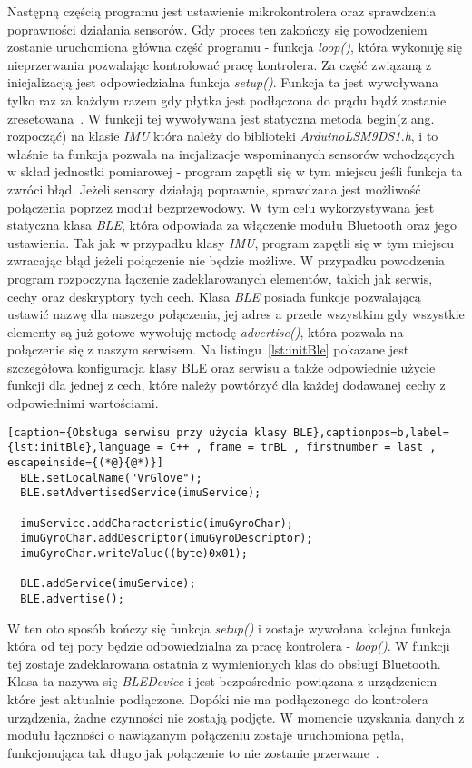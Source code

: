 Następną częścią programu jest ustawienie mikrokontrolera oraz sprawdzenia poprawności działania sensorów. Gdy proces ten zakończy się powodzeniem zostanie uruchomiona główna część programu - funkcja \textit{loop()}, która wykonuję się nieprzerwania pozwalając kontrolować pracę kontrolera. Za część związaną z inicjalizacją jest odpowiedzialna funkcja \textit{setup()}. Funkcja ta jest wywoływana tylko raz za każdym razem gdy płytka jest podłączona do prądu bądź zostanie zresetowana~\cite{ArduinoDoc}. W funkcji tej wywoływana jest statyczna metoda begin(z ang. rozpocząć) na klasie \textit{IMU} która należy do biblioteki \textit{Arduino\textunderscore LSM9DS1.h}, i to właśnie ta funkcja pozwala na incjalizacje wspominanych sensorów wchodzących w skład jednostki pomiarowej - program zapętli się w tym miejscu jeśli funkcja ta zwróci błąd.
Jeżeli sensory działają poprawnie, sprawdzana jest możliwość połączenia poprzez moduł bezprzewodowy. W tym celu wykorzystywana jest statyczna klasa \textit{BLE}, która odpowiada za włączenie modułu Bluetooth oraz jego ustawienia. Tak jak w przypadku klasy \textit{IMU}, program zapętli się w tym miejscu zwracając błąd jeżeli połączenie nie będzie możliwe. W przypadku powodzenia program rozpoczyna łączenie zadeklarowanych elementów, takich jak serwis, cechy oraz deskryptory tych cech. Klasa \textit{BLE} posiada funkcje pozwalającą ustawić nazwę dla naszego połączenia, jej adres a przede wszystkim gdy wszystkie elementy są już gotowe wywołuję metodę \textit{advertise()}, która pozwala na połączenie się z naszym serwisem. Na listingu~\ref{lst:initBle} pokazane jest szczegółowa konfiguracja klasy BLE oraz serwisu a także odpowiednie użycie funkcji dla jednej z cech, które należy powtórzyć dla każdej dodawanej cechy z odpowiednimi wartościami.
\begin{lstlisting}[caption={Obsługa serwisu przy użycia klasy BLE},captionpos=b,label={lst:initBle},language = C++ , frame = trBL , firstnumber = last , escapeinside={(*@}{@*)}]
  BLE.setLocalName("VrGlove");  
  BLE.setAdvertisedService(imuService);

  imuService.addCharacteristic(imuGyroChar);
  imuGyroChar.addDescriptor(imuGyroDescriptor);
  imuGyroChar.writeValue((byte)0x01);
  
  BLE.addService(imuService);     
  BLE.advertise();
\end{lstlisting}
W ten oto sposób kończy się funkcja \textit{setup()} i zostaje wywołana kolejna funkcja która od tej pory będzie odpowiedzialna za pracę kontrolera - \textit{loop()}. W funkcji tej zostaje zadeklarowana ostatnia z wymienionych klas do obsługi Bluetooth. Klasa ta nazywa się \textit{BLEDevice} i jest bezpośrednio powiązana z urządzeniem które jest aktualnie podłączone. Dopóki nie ma podłączonego do kontrolera urządzenia, żadne czynności nie zostają podjęte. W momencie uzyskania danych z modułu łączności o nawiązanym połączeniu zostaje uruchomiona pętla, funkcjonująca tak długo jak połączenie to nie zostanie przerwane~\cite{ArduinoBLE}.
